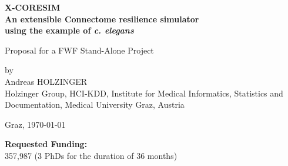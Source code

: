 \documentclass[a4paper,11pt]{article}
\begin{document}
\begin{titlepage}
\begin{center}
\bfseries\Large
X-CORESIM\\ 
An extensible Connectome resilience simulator \\
using the example of \emph{c. elegans}
\\[0,6cm]
\normalfont\normalsize

Proposal for a FWF Stand-Alone Project

by\\
Andreas HOLZINGER\\

Holzinger Group, HCI-KDD, Institute for Medical Informatics, Statistics and Documentation,
Medical University Graz, Austria
\\[0,4cm]
\vspace{0.7\baselineskip}
\begin{figure}[ht]
  \centering
\end{figure}
%
Graz, \today
%
\end{center}
\vspace{0.5\baselineskip}
\end{titlepage}
%
%
{\bf Requested Funding:}\\ 357,987 (3 PhDs for the duration of 36 months)
\\[0,3cm]
\end{document}
